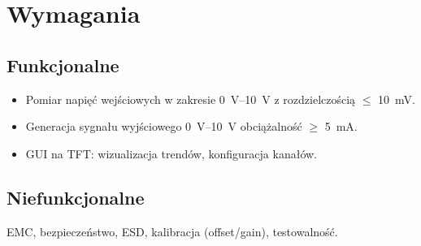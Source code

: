 \section{Wymagania}
\subsection{Funkcjonalne}
\begin{itemize}
  \item Pomiar napięć wejściowych w zakresie \SIrange{0}{10}{\volt} z rozdzielczością $\leq$ \SI{10}{\milli\volt}.
  \item Generacja sygnału wyjściowego \SIrange{0}{10}{\volt} obciążalność $\geq$ \SI{5}{\milli\ampere}.
  \item GUI na TFT: wizualizacja trendów, konfiguracja kanałów.
\end{itemize}
\subsection{Niefunkcjonalne}
EMC, bezpieczeństwo, ESD, kalibracja (offset/gain), testowalność.